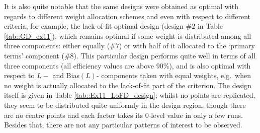 It is also quite notable that the same designs were obtained as optimal with regards to different weight allocation schemes and even with respect to different criteria, for example, the lack-of-fit optimal design (design \#$2$ in Table \ref{tab::GD_ex11}), which remains optimal if some weight is distributed among all three components: either equally (\#$7$) or with half of it allocated to the `primary terms' component (\#$8$). This particular design performs quite well in terms of all three components (all efficiency values are above $90\%$), and is also optimal with respect to $L-$ and Bias$(L)$- components taken with equal weights, e.g.~when no weight is actually allocated to the lack-of-fit part of the criterion. The design itself is given in Table \ref{tab::Ex11_LoFD_design}; whilst no points are replicated, they seem to be distributed quite uniformly in the design region, though there are no centre points and each factor takes its $0$-level value in only a few runs. Besides that, there are not any particular patterns of interest to be observed.
